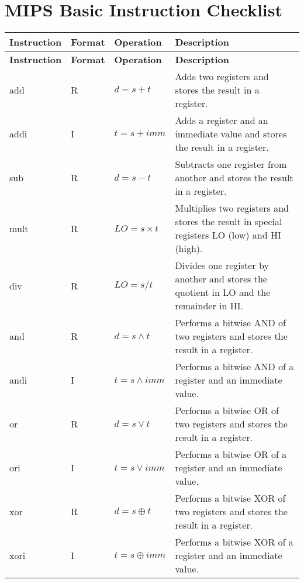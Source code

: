 \documentclass[12pt]{article}
\theoremstyle{definition}
\begin{document}
\section{MIPS Basic Instruction Checklist}


\begin{longtable}{|l|l|p{6cm}|p{6cm}|}
    \hline
    \textbf{Instruction} & \textbf{Format} & \textbf{Operation} & \textbf{Description} \\
    \hline
    \endfirsthead
    \hline
    \textbf{Instruction} & \textbf{Format} & \textbf{Operation} & \textbf{Description} \\
    \hline
    \endhead
    \hline
    \endfoot
    \hline
    \endlastfoot
    add  & R  & \raggedright $d = s + t$ & Adds two registers and stores the result in a register. \\
    \hline
    addi & I  & \raggedright $t = s + imm$ & Adds a register and an immediate value and stores the result in a register. \\
    \hline
    sub  & R  & \raggedright $d = s - t$ & Subtracts one register from another and stores the result in a register. \\
    \hline
    mult & R  & \raggedright $LO = s \times t$ & Multiplies two registers and stores the result in special registers LO (low) and HI (high). \\
    \hline
    div  & R  & \raggedright $LO = s / t$ & Divides one register by another and stores the quotient in LO and the remainder in HI. \\
    \hline
    and  & R  & \raggedright $d = s \land t$ & Performs a bitwise AND of two registers and stores the result in a register. \\
    \hline
    andi & I  & \raggedright $t = s \land imm$ & Performs a bitwise AND of a register and an immediate value. \\
    \hline
    or   & R  & \raggedright $d = s \lor t$ & Performs a bitwise OR of two registers and stores the result in a register. \\
    \hline
    ori  & I  & \raggedright $t = s \lor imm$ & Performs a bitwise OR of a register and an immediate value. \\
    \hline
    xor  & R  & \raggedright $d = s \oplus t$ & Performs a bitwise XOR of two registers and stores the result in a register. \\
    \hline
    xori & I  & \raggedright $t = s \oplus imm$ & Performs a bitwise XOR of a register and an immediate value. \\

\end{longtable}
\end{document}
